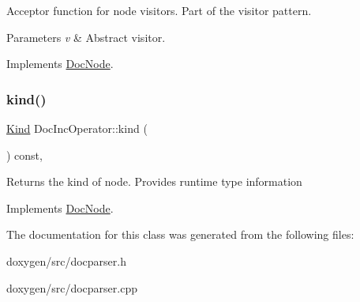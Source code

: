 Acceptor function for node visitors. Part of the visitor pattern. 
\begin{DoxyParams}{Parameters}
{\em v} & Abstract visitor. \\
\hline
\end{DoxyParams}


Implements \mbox{\hyperlink{class_doc_node_a5303a550cbe6395663bf9b9dad28cbf1}{Doc\+Node}}.

\mbox{\label{class_doc_inc_operator_a3534f7134847af9d29b60cbf308d0955}} 
\subsubsection{\texorpdfstring{kind()}{kind()}}
{\footnotesize\ttfamily \mbox{\hyperlink{class_doc_node_aebd16e89ca590d84cbd40543ea5faadb}{Kind}} Doc\+Inc\+Operator\+::kind (\begin{DoxyParamCaption}{ }\end{DoxyParamCaption}) const\hspace{0.3cm}{\ttfamily [inline]}, {\ttfamily [virtual]}}

Returns the kind of node. Provides runtime type information 

Implements \mbox{\hyperlink{class_doc_node_a108ffd214a72ba6e93dac084a8f58049}{Doc\+Node}}.



The documentation for this class was generated from the following files\+:\begin{DoxyCompactItemize}
\item 
doxygen/src/docparser.\+h\item 
doxygen/src/docparser.\+cpp\end{DoxyCompactItemize}
